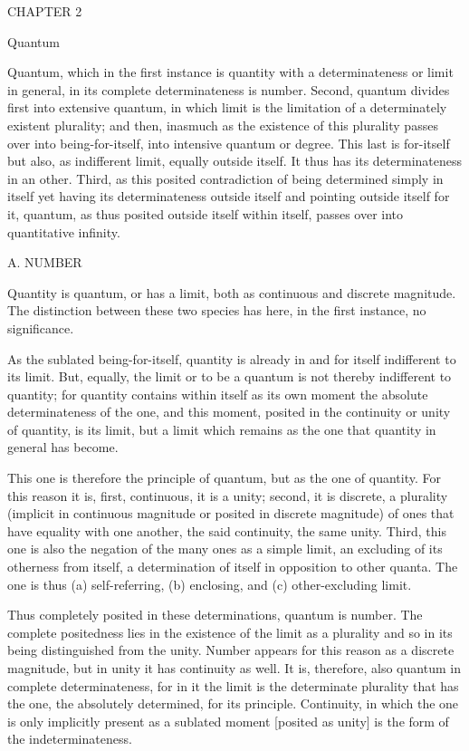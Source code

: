 CHAPTER 2

Quantum

Quantum, which in the first instance is quantity
with a determinateness or limit in general,
in its complete determinateness is number.
Second, quantum divides first into extensive quantum,
in which limit is the limitation of
a determinately existent plurality;
and then, inasmuch as the existence of
this plurality passes over into being-for-itself,
into intensive quantum or degree.
This last is for-itself but also,
as indifferent limit, equally outside itself.
It thus has its determinateness in an other.
Third, as this posited contradiction of
being determined simply in itself
yet having its determinateness outside itself
and pointing outside itself for it,
quantum, as thus posited outside itself within itself,
passes over into quantitative infinity.

A. NUMBER

Quantity is quantum, or has a limit,
both as continuous and discrete magnitude.
The distinction between these two species has here,
in the first instance, no significance.

As the sublated being-for-itself,
quantity is already in and for itself
indifferent to its limit.
But, equally, the limit or to be a quantum is
not thereby indifferent to quantity;
for quantity contains within itself as its own moment
the absolute determinateness of the one,
and this moment, posited in the continuity
or unity of quantity, is its limit,
but a limit which remains as the one
that quantity in general has become.

This one is therefore the principle of quantum,
but as the one of quantity.
For this reason it is,
first, continuous, it is a unity;
second, it is discrete, a plurality
(implicit in continuous magnitude
or posited in discrete magnitude)
of ones that have equality with one another,
the said continuity, the same unity.
Third, this one is also the negation of
the many ones as a simple limit,
an excluding of its otherness from itself,
a determination of itself in opposition to other quanta.
The one is thus
(a) self-referring,
(b) enclosing, and
(c) other-excluding limit.

Thus completely posited in these determinations,
quantum is number.
The complete positedness lies in
the existence of the limit as a plurality
and so in its being distinguished from the unity.
Number appears for this reason as a discrete magnitude,
but in unity it has continuity as well.
It is, therefore, also quantum in complete determinateness,
for in it the limit is the determinate plurality
that has the one, the absolutely determined, for its principle.
Continuity, in which the one is only implicitly present
as a sublated moment [posited as unity] is
the form of the indeterminateness.

